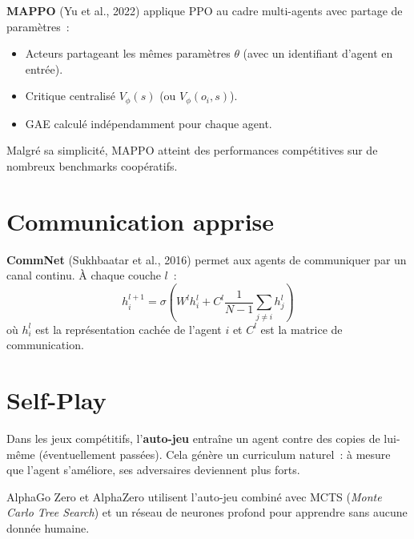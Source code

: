 \begin{definition}[MAPPO]
\textbf{MAPPO} (Yu et al., 2022) applique PPO au cadre multi-agents avec
partage de param\`etres~:
\begin{itemize}
    \item Acteurs partageant les m\^emes param\`etres $\theta$ (avec un identifiant d'agent en entr\'ee).
    \item Critique centralis\'e $V_\phi(s)$ (ou $V_\phi(o_i, s)$).
    \item GAE calcul\'e ind\'ependamment pour chaque agent.
\end{itemize}
Malgr\'e sa simplicit\'e, MAPPO atteint des performances comp\'etitives sur de
nombreux benchmarks coop\'eratifs.
\end{definition}

\section{Communication apprise}

\begin{definition}[CommNet]
\textbf{CommNet} (Sukhbaatar et al., 2016) permet aux agents de communiquer
par un canal continu. \`A chaque couche $l$~:
\[
    h_i^{l+1} = \sigma\left(W^l h_i^l + C^l \frac{1}{N-1}\sum_{j \neq i} h_j^l\right)
\]
o\`u $h_i^l$ est la repr\'esentation cach\'ee de l'agent $i$ et $C^l$ est la
matrice de communication.
\end{definition}

\section{Self-Play}

\begin{definition}
Dans les jeux comp\'etitifs, l'\textbf{auto-jeu} entra\^ine un agent contre
des copies de lui-m\^eme (\'eventuellement pass\'ees). Cela g\'en\`ere un
curriculum naturel~: \`a mesure que l'agent s'am\'eliore, ses adversaires
deviennent plus forts.
\end{definition}

\begin{remarque}
AlphaGo Zero et AlphaZero utilisent l'auto-jeu combin\'e avec MCTS
(\emph{Monte Carlo Tree Search}) et un r\'eseau de neurones profond pour
apprendre sans aucune donn\'ee humaine.
\end{remarque}

